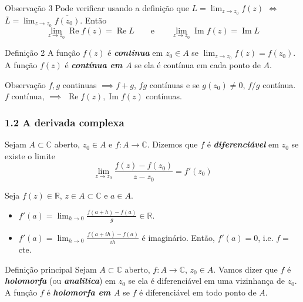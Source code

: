 \begin{thing5}{Observação 3}\label{rk:3}\leavevmode
	Pode verificar usando a definição que \(L=\lim_{z \to z_0} f(z)\) \(\iff\) \(\overline{L}=\lim_{z \to z_0} \overline{f(z_0)}\). Então \[\lim_{z \to z_0} \operatorname{Re}f(z)=\operatorname{Re}L\qquad  \text{e} \qquad \lim_{z \to z_0} \operatorname{Im}f(z)=\operatorname{Im}L\]
\end{thing5}

\begin{thing4}{Definição 2}\label{def:2}\leavevmode
A função \(f(z)\) é \textit{\textbf{contínua}} em \(z_0 \in A\) se \(\lim_{z \to z_0} f(z)= f(z_0)\). A função \(f(z)\) é \textit{\textbf{contínua em \(A\)}} se ela é contínua em cada ponto de \(A\).
\end{thing4}

\begin{thing5}{Observação}\label{rk:}\leavevmode
\(f,g\) continuas \(\implies\)\(f+g\), \(fg\) contínuas e se \(g(z_0) \neq 0\), \(f/g\) contínua. \(f\) contínua, \(\implies\) \(\operatorname{Re}f(z),\operatorname{Im}f(z)\) contínuas.
\end{thing5}

\subsubsection{1.2 A derivada complexa}

\begin{defn}\leavevmode
Sejam \(A \subset\mathbb{C}\) aberto, \(z_0 \in A\) e \(f:A \to \mathbb{C}\). Dizemos que \(f\) é \textit{\textbf{diferenciável}} em \(z_0\) se existe o limite
\[\lim_{z \to z_0} \frac{f(z)-f(z_0)}{z-z_0}=f'(z_0)\]
\end{defn}

\begin{example}\leavevmode
Seja \(f(z) \in \mathbb{R}\), \(z \in A \subset \mathbb{C}\) e \(a \in A\).
\begin{itemize}
\item \(f'(a) = \lim_{ h \to 0} \frac{f(a+h)-f(a)}{g} \in \mathbb{R}\).
\item \(f'(a)=\lim_{h \to 0} \frac{f(a+ih)-f(a)}{ih}\) é imaginário.
Então, \(f'(a)=0\), i.e. \(f=\) cte.
\end{itemize}
\end{example}

\begin{thing7}{Definição principal}\leavevmode
Sejam \(A \subset \mathbb{C}\) aberto, \(f:A \to \mathbb{C}\), \(z_0 \in A\). Vamos dizer que \(f\) é \textit{\textbf{holomorfa}} (ou \textit{\textbf{analítica}}) em \(z_0\) se ela é diferenciável em uma vizinhança de \(z_0\). A função \(f\) é \textit{\textbf{holomorfa em \(A\)}} se \(f\) é diferenciável em todo ponto de \(A\).
\end{thing7}

